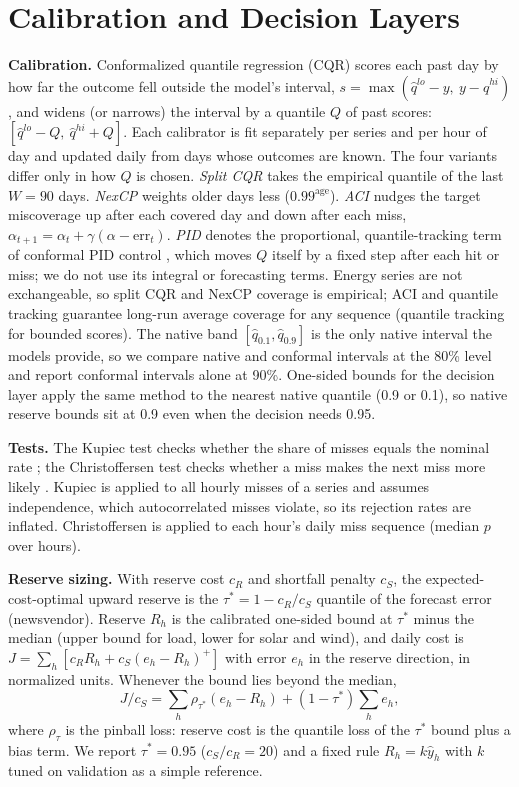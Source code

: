 \documentclass[conference]{IEEEtran}
\begin{document}
\section{Calibration and Decision Layers}
\textbf{Calibration.} Conformalized quantile regression (CQR) \cite{romano2019cqr} scores each past day by how far the outcome fell outside the model's interval, $s=\max(\hat q^{lo}-y,\ y-\hat q^{hi})$, and widens (or narrows) the interval by a quantile $Q$ of past scores: $[\hat q^{lo}-Q,\ \hat q^{hi}+Q]$. Each calibrator is fit separately per series and per hour of day and updated daily from days whose outcomes are known. The four variants differ only in how $Q$ is chosen. \emph{Split CQR} takes the empirical quantile of the last $W=90$ days. \emph{NexCP} \cite{barber2023nexcp} weights older days less ($0.99^{\text{age}}$). \emph{ACI} \cite{gibbs2021aci} nudges the target miscoverage up after each covered day and down after each miss, $\alpha_{t+1}=\alpha_t+\gamma(\alpha-\text{err}_t)$. \emph{PID} denotes the proportional, quantile-tracking term of conformal PID control \cite{angelopoulos2023pid}, which moves $Q$ itself by a fixed step after each hit or miss; we do not use its integral or forecasting terms. Energy series are not exchangeable, so split CQR and NexCP coverage is empirical; ACI and quantile tracking guarantee long-run average coverage for any sequence (quantile tracking for bounded scores). The native band $[\hat q_{0.1},\hat q_{0.9}]$ is the only native interval the models provide, so we compare native and conformal intervals at the 80\% level and report conformal intervals alone at 90\%. One-sided bounds for the decision layer apply the same method to the nearest native quantile (0.9 or 0.1), so native reserve bounds sit at 0.9 even when the decision needs 0.95.

\textbf{Tests.} The Kupiec test checks whether the share of misses equals the nominal rate \cite{kupiec1995}; the Christoffersen test checks whether a miss makes the next miss more likely \cite{christoffersen1998}. Kupiec is applied to all hourly misses of a series and assumes independence, which autocorrelated misses violate, so its rejection rates are inflated. Christoffersen is applied to each hour's daily miss sequence (median $p$ over hours).

\textbf{Reserve sizing.} With reserve cost $c_R$ and shortfall penalty $c_S$, the expected-cost-optimal upward reserve is the $\tau^*=1-c_R/c_S$ quantile of the forecast error (newsvendor). Reserve $R_h$ is the calibrated one-sided bound at $\tau^*$ minus the median (upper bound for load, lower for solar and wind), and daily cost is $J=\sum_h [c_R R_h + c_S (e_h-R_h)^+]$ with error $e_h$ in the reserve direction, in normalized units. Whenever the bound lies beyond the median,
\begin{equation}
J/c_S=\textstyle\sum_h \rho_{\tau^*}(e_h-R_h)+(1-\tau^*)\sum_h e_h,
\label{eq:decomp}
\end{equation}
where $\rho_\tau$ is the pinball loss: reserve cost is the quantile loss of the $\tau^*$ bound plus a bias term. We report $\tau^*=0.95$ ($c_S/c_R=20$) and a fixed rule $R_h=k\hat y_h$ with $k$ tuned on validation as a simple reference.
\end{document}
